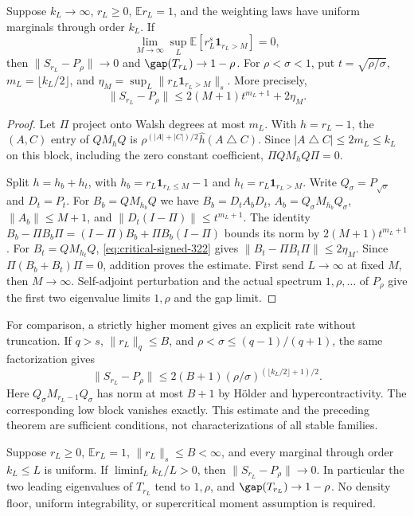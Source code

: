 \begin{theorem}
\label{thm:marginal-ui}
Suppose $k_L\to\infty$, $r_L\geq0$, $\mathbb E r_L=1$, and the
weighting laws have uniform marginals through order $k_L$. If
\[
 \lim_{M\to\infty}\sup_L
 \mathbb E[r_L^s\mathbf1_{r_L>M}]=0,
\]
then $\|S_{r_L}-P_\rho\|\to0$ and $\gap(T_{r_L})\to1-\rho$.
For $\rho<\sigma<1$, put $t=\sqrt{\rho/\sigma}$,
$m_L=\lfloor k_L/2\rfloor$, and
$\eta_M=\sup_L\|r_L\mathbf1_{r_L>M}\|_s$. More precisely,
\[
 \|S_{r_L}-P_\rho\|
 \leq2(M+1)t^{m_L+1}+2\eta_M.
\]
\end{theorem}
\begin{proof}
Let $\Pi$ project onto Walsh degrees at most $m_L$. With $h=r_L-1$,
the $(A,C)$ entry of $QM_hQ$ is
$\rho^{(|A|+|C|)/2}\widehat h(A\mathbin\triangle C)$.
Since $|A\mathbin\triangle C|\leq2m_L\leq k_L$ on this block,
including the zero constant coefficient, $\Pi QM_hQ\Pi=0$.

Split $h=h_b+h_t$, with $h_b=r_L\mathbf1_{r_L\leq M}-1$ and
$h_t=r_L\mathbf1_{r_L>M}$. Write $Q_\sigma=P_{\sqrt\sigma}$ and
$D_t=P_t$. For $B_b=QM_{h_b}Q$ we have
$B_b=D_t A_bD_t$, $A_b=Q_\sigma M_{h_b}Q_\sigma$,
$\|A_b\|\leq M+1$, and $\|D_t(I-\Pi)\|\leq t^{m_L+1}$.
The identity
$B_b-\Pi B_b\Pi=(I-\Pi)B_b+\Pi B_b(I-\Pi)$ bounds its norm by
$2(M+1)t^{m_L+1}$. For $B_t=QM_{h_t}Q$,
\eqref{eq:critical-signed-322} gives $\|B_t-\Pi B_t\Pi\|\leq2\eta_M$.
Since $\Pi(B_b+B_t)\Pi=0$, addition proves the estimate.
First send $L\to\infty$ at fixed $M$, then $M\to\infty$.
Self-adjoint perturbation and the actual spectrum $1,\rho,\ldots$ of
$P_\rho$ give the first two eigenvalue limits $1,\rho$ and the gap limit.
\end{proof}

For comparison, a strictly higher moment gives an explicit rate without
truncation. If $q>s$, $\|r_L\|_q\leq B$, and
$\rho<\sigma\leq(q-1)/(q+1)$, the same factorization gives
\[
 \|S_{r_L}-P_\rho\|\leq2(B+1)
 (\rho/\sigma)^{(\lfloor k_L/2\rfloor+1)/2}.
\]
Here $Q_\sigma M_{r_L-1}Q_\sigma$ has norm at most $B+1$ by
H\"older and hypercontractivity. The corresponding low block vanishes
exactly. This estimate and the preceding theorem are sufficient conditions,
not characterizations of all stable families.

\begin{theorem}
\label{thm:linear-marginal-rigidity}
Suppose $r_L\geq0$, $\mathbb E r_L=1$, $\|r_L\|_s\leq B<\infty$,
and every marginal through order $k_L\leq L$ is uniform. If
$\liminf_L k_L/L>0$, then $\|S_{r_L}-P_\rho\|\to0$.
In particular the two leading eigenvalues of $T_{r_L}$ tend to $1,\rho$,
and $\gap(T_{r_L})\to1-\rho$. No density floor, uniform integrability,
or supercritical moment assumption is required.
\end{theorem}

